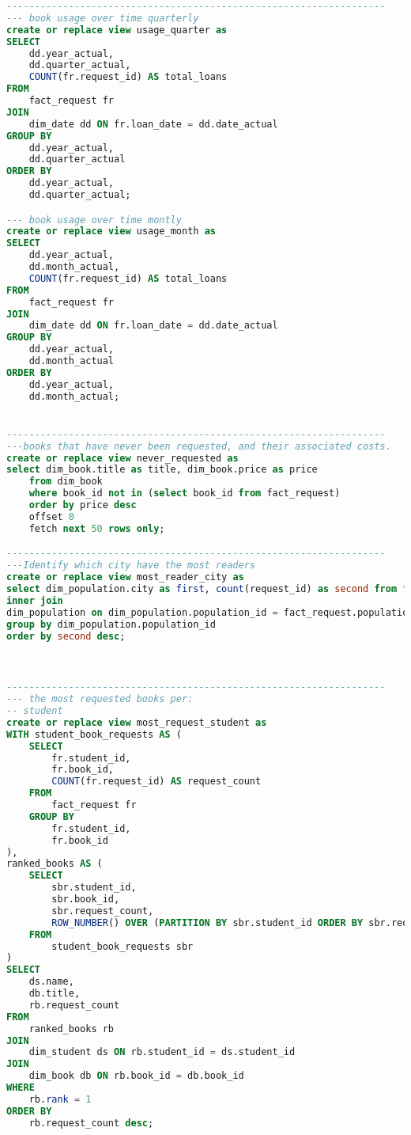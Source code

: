 \begin{lstlisting}[language=SQL, caption={init.sql}, label={lst:init_sql}]
-------------------------------------------------------------------
--- book usage over time quarterly
create or replace view usage_quarter as
SELECT
    dd.year_actual,
    dd.quarter_actual,
    COUNT(fr.request_id) AS total_loans
FROM
    fact_request fr
JOIN
    dim_date dd ON fr.loan_date = dd.date_actual
GROUP BY
    dd.year_actual,
    dd.quarter_actual
ORDER BY
    dd.year_actual,
    dd.quarter_actual;

--- book usage over time montly
create or replace view usage_month as
SELECT
    dd.year_actual,
    dd.month_actual,
    COUNT(fr.request_id) AS total_loans
FROM
    fact_request fr
JOIN
    dim_date dd ON fr.loan_date = dd.date_actual
GROUP BY
    dd.year_actual,
    dd.month_actual
ORDER BY
    dd.year_actual,
    dd.month_actual;


-------------------------------------------------------------------
---books that have never been requested, and their associated costs.
create or replace view never_requested as
select dim_book.title as title, dim_book.price as price
	from dim_book
	where book_id not in (select book_id from fact_request)
	order by price desc
	offset 0
    fetch next 50 rows only;

-------------------------------------------------------------------
---Identify which city have the most readers
create or replace view most_reader_city as
select dim_population.city as first, count(request_id) as second from fact_request
inner join
dim_population on dim_population.population_id = fact_request.population_id
group by dim_population.population_id
order by second desc;



-------------------------------------------------------------------
--- the most requested books per:
-- student
create or replace view most_request_student as
WITH student_book_requests AS (
    SELECT
        fr.student_id,
        fr.book_id,
        COUNT(fr.request_id) AS request_count
    FROM
        fact_request fr
    GROUP BY
        fr.student_id,
        fr.book_id
),
ranked_books AS (
    SELECT
        sbr.student_id,
        sbr.book_id,
        sbr.request_count,
        ROW_NUMBER() OVER (PARTITION BY sbr.student_id ORDER BY sbr.request_count DESC) AS rank
    FROM
        student_book_requests sbr
)
SELECT
    ds.name,
    db.title,
    rb.request_count
FROM
    ranked_books rb
JOIN
    dim_student ds ON rb.student_id = ds.student_id
JOIN
    dim_book db ON rb.book_id = db.book_id
WHERE
    rb.rank = 1
ORDER BY
    rb.request_count desc;



\end{lstlisting}
